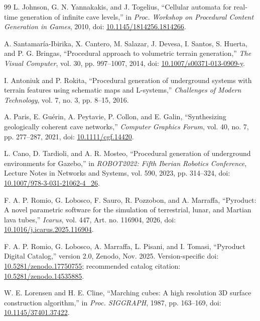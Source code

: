 \begin{thebibliography}{99}
L. Johnson, G. N. Yannakakis, and J. Togelius,
``Cellular automata for real-time generation of infinite cave levels,''
in \emph{Proc. Workshop on Procedural Content Generation in Games}, 2010,
doi: \href{https://doi.org/10.1145/1814256.1814266}{10.1145/1814256.1814266}.

A. Santamar\'ia-Ibirika, X. Cantero, M. Salazar, J. Devesa, I. Santos, S. Huerta, and P. G. Bringas,
``Procedural approach to volumetric terrain generation,''
\emph{The Visual Computer}, vol. 30, pp. 997--1007, 2014,
doi: \href{https://doi.org/10.1007/s00371-013-0909-y}{10.1007/s00371-013-0909-y}.

I. Antoniuk and P. Rokita,
``Procedural generation of underground systems with terrain features using schematic maps and L-systems,''
\emph{Challenges of Modern Technology}, vol. 7, no. 3, pp. 8--15, 2016.

A. Paris, E. Gu\'erin, A. Peytavie, P. Collon, and E. Galin,
``Synthesizing geologically coherent cave networks,''
\emph{Computer Graphics Forum}, vol. 40, no. 7, pp. 277--287, 2021,
doi: \href{https://doi.org/10.1111/cgf.14420}{10.1111/cgf.14420}.

L. Cano, D. Tardioli, and A. R. Mosteo,
``Procedural generation of underground environments for Gazebo,''
in \emph{ROBOT2022: Fifth Iberian Robotics Conference},
Lecture Notes in Networks and Systems, vol. 590, 2023, pp. 314--324,
doi: \href{https://doi.org/10.1007/978-3-031-21062-4_26}{10.1007/978-3-031-21062-4\_26}.

F. A. P. Romio, G. Lobosco, F. Sauro, R. Pozzobon, and A. Marraffa,
``Pyroduct: A novel parametric software for the simulation of terrestrial, lunar, and Martian lava tubes,''
\emph{Icarus}, vol. 447, Art. no. 116904, 2026,
doi: \href{https://doi.org/10.1016/j.icarus.2025.116904}{10.1016/j.icarus.2025.116904}.

F. A. P. Romio, G. Lobosco, A. Marraffa, L. Pisani, and I. Tomasi,
``Pyroduct Digital Catalog,'' version 2.0, Zenodo, Nov. 2025.
Version-specific doi: \href{https://doi.org/10.5281/zenodo.17750755}{10.5281/zenodo.17750755};
recommended catalog citation: \href{https://doi.org/10.5281/zenodo.14535885}{10.5281/zenodo.14535885}.

W. E. Lorensen and H. E. Cline,
``Marching cubes: A high resolution 3D surface construction algorithm,''
in \emph{Proc. SIGGRAPH}, 1987, pp. 163--169,
doi: \href{https://doi.org/10.1145/37401.37422}{10.1145/37401.37422}.

\end{thebibliography}

